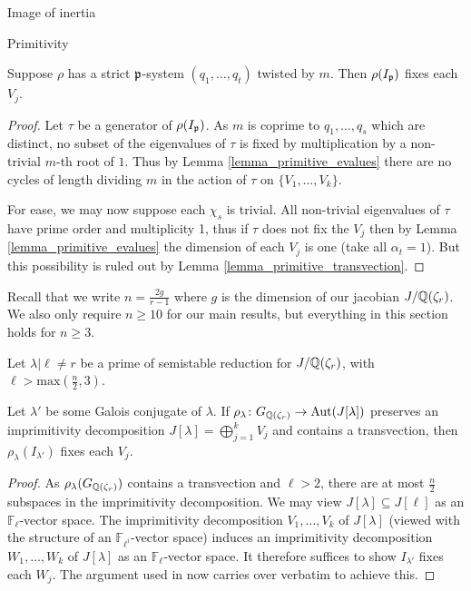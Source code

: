 \documentclass[11pt,a4paper]{article}
\newcommand{\Fl}{\mathbb{F}_\ell}
\newcommand{\Fli}{\mathbb{F}_{\ell^i}}
\newcommand{\Qr}{{\QQ(\zeta_r)}}
\newcommand{\GQr}{G_{\QQ(\zeta_{r})}}
\begin{document}
\begin{section}{Image of inertia}
\begin{subsection}{Primitivity}
\begin{proposition}
Suppose $\rho$ has a strict $\mathfrak{p}$-system $(q_1, \ldots, q_t)$ twisted by $m$.
Then $\rho(I_{\mathfrak{p}})$ fixes each $V_j$. 
\end{proposition}

\begin{proof}
 Let $\tau$ be a generator of $\rho(I_{\mathfrak{p}})$. As $m$ is coprime to $q_1, \ldots,q_s $ which are distinct, no subset of the eigenvalues of $\tau$ is fixed by multiplication by a non-trivial $m$-th root of $1$. Thus by Lemma \ref{lemma_primitive_evalues} there are no cycles of length dividing $m$ in the action of $\tau$ on $\{V_1, \ldots, V_k\}$.

For ease, we may now suppose each $\chi_s$ is trivial. All non-trivial eigenvalues of $\tau$ have prime order and multiplicity 1, thus if $\tau$ does not fix the $V_j$ then by Lemma \ref{lemma_primitive_evalues} the dimension of each $V_j$ is one (take all $\alpha_t=1$). But this possibility is ruled out by Lemma \ref{lemma_primitive_transvection}.
\end{proof}


Recall that we write $n=\frac{2g}{r-1}$ where $g$ is the dimension of our jacobian $J/\Qr$.
We also only require $n \geq 10$ for our main results, but everything in this section holds for $n \geq 3$.

\begin{proposition}
\label{prop_primitivity_l_big_enough_no_worries}
Let $\lambda|\ell \neq r$ be a prime of semistable reduction for $J/\Qr$, with $\ell> \mathrm {max}(\frac{n}{2},3)$.

Let $\lambda'$ be some Galois conjugate of $\lambda$.
If $\rho_{\lambda} \colon \GQr \rightarrow \Aut(J[\lambda])$ preserves an imprimitivity decomposition $J[\lambda] = \bigoplus^{k}_{j=1} V_j$ and contains a transvection, then $\rho_{\lambda}(I_{\lambda'})$ fixes each $V_j$.
\end{proposition}

\begin{proof}
 As $\rho_{\lambda}(\GQr)$ contains a transvection and $\ell>2$, there are at most $\frac{n}{2}$ subspaces in the imprimitivity decomposition. We may view $J[\lambda] \subseteq J[\ell]$ as an $\Fl$-vector space. The imprimitivity decomposition $V_1, \ldots, V_k$ of $J[\lambda]$ (viewed with the structure of an $\Fli$-vector space) induces an imprimitivity decomposition $W_1, \ldots, W_k$ of  $J[\lambda] $ as an $\Fl$-vector space.
 It therefore suffices to show $I_{\lambda'}$ fixes each $W_j$.
  The argument used in \cite[Prop.4.12]{Anni_VDok} now carries over verbatim to achieve this.
\end{proof}



\end{subsection}
\end{section}
\end{document}
